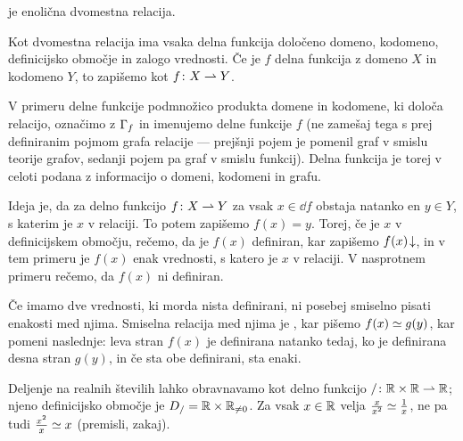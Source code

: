 		\begin{definicija}
			 je enolična dvomestna relacija.
		\end{definicija}
		
		Kot dvomestna relacija ima vsaka delna funkcija določeno domeno, kodomeno, definicijsko območje in zalogo vrednosti. Če je $f$ delna funkcija z domeno $X$ in kodomeno $Y$, to zapišemo kot $f\colon X \mathrel{\rightharpoonup} Y$.
		
		V primeru delne funkcije podmnožico produkta domene in kodomene, ki določa relacijo, označimo z $\Gamma_{f}$ in imenujemo  delne funkcije $f$ (ne zamešaj tega s prej definiranim pojmom grafa relacije --- prejšnji pojem je pomenil graf v smislu teorije grafov, sedanji pojem pa graf v smislu funkcij). Delna funkcija je torej v celoti podana z informacijo o domeni, kodomeni in grafu.
		
		Ideja je, da za delno funkcijo $f\colon X \mathrel{\rightharpoonup} Y$ za vsak $x \in \dd{f}$ obstaja natanko en $y \in Y$, s katerim je $x$ v relaciji. To potem zapišemo $f(x) = y$. Torej, če je $x$ v definicijskem območju, rečemo, da je $f(x)$ definiran, kar zapišemo ${f(x)}\!\downarrow$, in v tem primeru je $f(x)$ enak vrednosti, s katero je $x$ v relaciji. V nasprotnem primeru rečemo, da $f(x)$ ni definiran.
		
		Če imamo dve vrednosti, ki morda nista definirani, ni posebej smiselno pisati enakosti med njima. Smiselna relacija med njima je , kar pišemo $f(x) \simeq g(y)$, kar pomeni naslednje: leva stran $f(x)$ je definirana natanko tedaj, ko je definirana desna stran $g(y)$, in če sta obe definirani, sta enaki.
		
		\begin{zgled}
			Deljenje na realnih številih lahko obravnavamo kot delno funkcijo $/\colon \mathbb{R} \times \mathbb{R} \mathrel{\rightharpoonup} \mathbb{R}$; njeno definicijsko območje je $D_{/} = \mathbb{R} \times \mathbb{R}_{\neq 0}$. Za vsak $x \in \mathbb{R}$ velja $\frac{x}{x^2} \simeq \frac{1}{x}$, ne pa tudi $\frac{x^2}{x} \simeq x$ (premisli, zakaj).
		\end{zgled}
		
